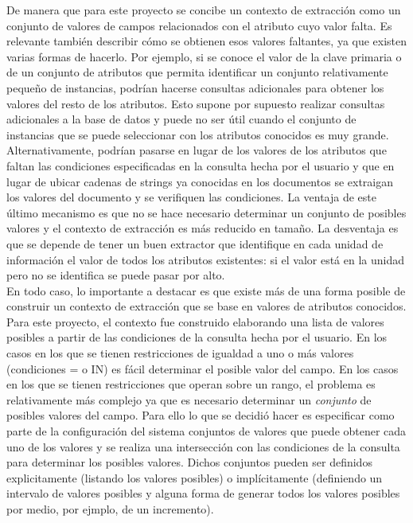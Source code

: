 De manera que para este proyecto se concibe un contexto de extracción como un conjunto de valores de campos relacionados con el atributo cuyo valor falta. Es relevante también describir cómo se obtienen esos valores faltantes, ya que existen varias formas de hacerlo. Por ejemplo, si se conoce el valor de la clave primaria o de un conjunto de atributos que permita identificar un conjunto relativamente pequeño de instancias, podrían hacerse consultas adicionales para obtener los valores del resto de los atributos. Esto supone por supuesto realizar consultas adicionales a la base de datos y puede no ser útil cuando el conjunto de instancias que se puede seleccionar con los atributos conocidos es muy grande. \\

Alternativamente, podrían pasarse en lugar de los valores de los atributos que faltan las condiciones especificadas en la consulta hecha por el usuario y que en lugar de ubicar cadenas de strings ya conocidas en los documentos se extraigan los valores del documento y se verifiquen las condiciones. La ventaja de este último mecanismo es que no se hace necesario determinar un conjunto de posibles valores y el contexto de extracción es más reducido en tamaño. La desventaja es que se depende de tener un buen extractor que identifique en cada unidad de información el valor de todos los atributos existentes: si el valor está en la unidad pero no se identifica se puede pasar por alto. \\ 

En todo caso, lo importante a destacar es que existe más de una forma posible de construir un contexto de extracción que se base en valores de atributos conocidos. Para este proyecto, el contexto fue construido elaborando una lista de valores posibles a partir de las condiciones de la consulta hecha por el usuario. En los casos en los que se tienen restricciones de igualdad a uno o más valores (condiciones = o IN) es fácil determinar el posible valor del campo. En los casos en los que se tienen restricciones que operan sobre un rango, el problema es relativamente más complejo ya que es necesario determinar un \emph{conjunto} de posibles valores del campo. Para ello lo que se decidió hacer es especificar como parte de la configuración del sistema conjuntos de valores que puede obtener cada uno de los valores y se realiza una intersección con las condiciones de la consulta para determinar los posibles valores. Dichos conjuntos pueden ser definidos explicitamente (listando los valores posibles) o implícitamente (definiendo un intervalo de valores posibles y alguna forma de generar todos los valores posibles por medio, por ejmplo, de un incremento). \\

